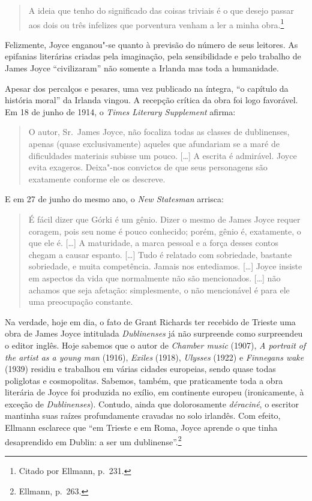 {\begin{quote}
A ideia que tenho do significado
das coisas triviais é o que desejo passar aos dois ou três infelizes que
porventura venham a ler a minha obra.\footnote{ Citado por Ellmann, p.~231.}
\end{quote}

Felizmente, Joyce enganou"-se quanto à previsão do número de seus leitores. As
epifanias literárias criadas pela imaginação, pela sensibilidade e pelo
trabalho de James Joyce “civilizaram” não somente a Irlanda mas toda a
humanidade.

Apesar dos percalços e pesares, uma vez publicado na íntegra, “o capítulo da
história moral” da Irlanda vingou. A recepção crítica da obra foi logo
favorável.  Em 18 de junho de 1914, o \textit{Times Literary Supplement}
afirma:

\begin{quote}
O autor, Sr.~James Joyce, não focaliza todas as classes de dublinenses, apenas
(quase exclusivamente) aqueles que afundariam se a maré de dificuldades
materiais subisse um pouco. [\ldots{}] A escrita é admirável. Joyce evita exageros.
Deixa"-nos convictos de que seus personagens são exatamente conforme ele os
descreve.
\end{quote}

E em 27 de junho do mesmo ano, o \textit{New Statesman} arrisca:

\begin{quote}
É fácil dizer que Górki é um gênio. Dizer o mesmo de James Joyce requer coragem,
pois seu nome é pouco conhecido; porém, gênio é, exatamente, o que ele é. [\ldots{}]
A maturidade, a marca pessoal e a força desses contos chegam a causar espanto.
[\ldots{}] Tudo é relatado com sobriedade, bastante sobriedade, e muita competência.
Jamais nos entediamos. [\ldots{}] Joyce insiste em aspectos da vida que normalmente
não são mencionados. [\ldots{}] não achamos que seja afetação: simplesmente, o não
mencionável é para ele uma preocupação constante.
\end{quote}

Na verdade, hoje em dia, o fato de Grant Richards ter recebido de Trieste uma
obra de James Joyce intitulada \textit{Dublinenses} já não surpreende como
surpreendeu o editor inglês. Hoje sabemos que o autor de \textit{Chamber music}
(1907), \textit{A portrait of the artist as a young man} (1916),
\textit{Exiles} (1918), \textit{Ulysses} (1922) e \textit{Finnegans wake}
(1939) residiu e trabalhou em várias cidades europeias, sendo quase todas
poliglotas e cosmopolitas. Sabemos, também, que praticamente toda a obra
literária de Joyce foi produzida no exílio, em continente europeu (ironicamente,
à exceção de \textit{Dublinenses}). Contudo, ainda que dolorosamente
\textit{déraciné}, o escritor mantinha suas raízes profundamente cravadas no
solo irlandês. Com efeito, Ellmann esclarece que “em Trieste e em Roma, Joyce
aprende o que tinha desaprendido em Dublin: a ser um dublinense”.\footnote{ Ellmann, p.~263.}


}
